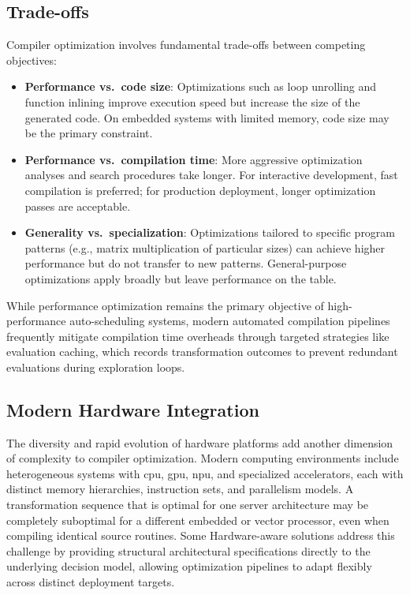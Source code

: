 \subsection{Trade-offs}

Compiler optimization involves fundamental trade-offs between competing objectives:

\begin{itemize}
    \item \textbf{Performance vs.\ code size}: Optimizations such as loop unrolling and function inlining improve execution speed but increase the size of the generated code. On embedded systems with limited memory, code size may be the primary constraint.
    \item \textbf{Performance vs.\ compilation time}: More aggressive optimization analyses and search procedures take longer. For interactive development, fast compilation is preferred; for production deployment, longer optimization passes are acceptable.
    \item \textbf{Generality vs.\ specialization}: Optimizations tailored to specific program patterns (e.g., matrix multiplication of particular sizes) can achieve higher performance but do not transfer to new patterns. General-purpose optimizations apply broadly but leave performance on the table.
\end{itemize}

While performance optimization remains the primary objective of high-performance auto-scheduling systems, modern automated compilation pipelines frequently mitigate compilation time overheads through targeted strategies like evaluation caching, which records transformation outcomes to prevent redundant evaluations during exploration loops.

\subsection{Modern Hardware Integration}

The diversity and rapid evolution of hardware platforms add another dimension of complexity to compiler optimization. Modern computing environments include heterogeneous systems with \gls{cpu}, \gls{gpu}, \gls{npu}, and specialized accelerators, each with distinct memory hierarchies, instruction sets, and parallelism models. A transformation sequence that is optimal for one server architecture may be completely suboptimal for a different embedded or vector processor, even when compiling identical source routines. Some Hardware-aware solutions address this challenge by providing structural architectural specifications directly to the underlying decision model, allowing optimization pipelines to adapt flexibly across distinct deployment targets.

